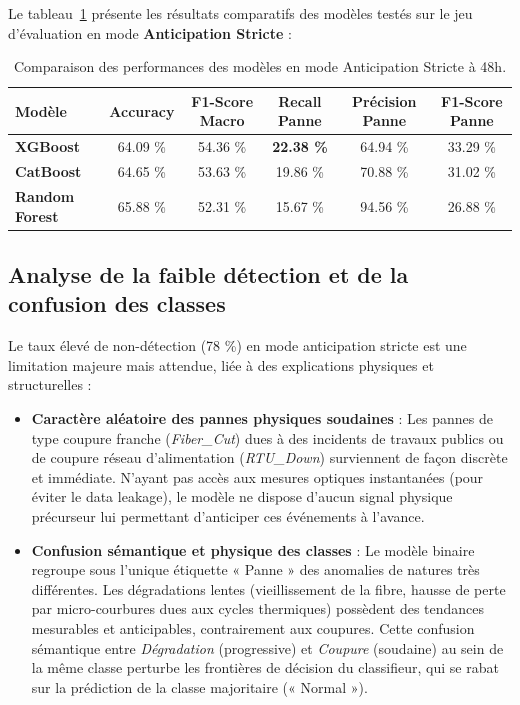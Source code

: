 \documentclass[11pt,a4paper]{article}
\begin{document}
Le tableau~\ref{tab:model_comparison} présente les résultats comparatifs des modèles testés sur le jeu d'évaluation en mode \textbf{Anticipation Stricte} :

\begin{table}[H]
\centering
\caption{Comparaison des performances des modèles en mode Anticipation Stricte à 48h.}
\label{tab:model_comparison}
\small
\begin{tabular}{lccccc}
\toprule
\textbf{Modèle} & \textbf{Accuracy} & \textbf{F1-Score Macro} & \textbf{Recall Panne} & \textbf{Précision Panne} & \textbf{F1-Score Panne} \\
\midrule
\textbf{XGBoost} & 64.09 \% & 54.36 \% & \textbf{22.38 \%} & 64.94 \% & 33.29 \% \\
\textbf{CatBoost} & 64.65 \% & 53.63 \% & 19.86 \% & 70.88 \% & 31.02 \% \\
\textbf{Random Forest} & 65.88 \% & 52.31 \% & 15.67 \% & 94.56 \% & 26.88 \% \\
\bottomrule
\end{tabular}
\end{table}

\subsection{Analyse de la faible détection et de la confusion des classes}
Le taux élevé de non-détection (78 \%) en mode anticipation stricte est une limitation majeure mais attendue, liée à des explications physiques et structurelles :
\begin{itemize}
    \item \textbf{Caractère aléatoire des pannes physiques soudaines} : Les pannes de type coupure franche (\textit{Fiber\_Cut}) dues à des incidents de travaux publics ou de coupure réseau d'alimentation (\textit{RTU\_Down}) surviennent de façon discrète et immédiate. N'ayant pas accès aux mesures optiques instantanées (pour éviter le data leakage), le modèle ne dispose d'aucun signal physique précurseur lui permettant d'anticiper ces événements à l'avance.
    \item \textbf{Confusion sémantique et physique des classes} : Le modèle binaire regroupe sous l'unique étiquette « Panne » des anomalies de natures très différentes. Les dégradations lentes (vieillissement de la fibre, hausse de perte par micro-courbures dues aux cycles thermiques) possèdent des tendances mesurables et anticipables, contrairement aux coupures. Cette confusion sémantique entre \textit{Dégradation} (progressive) et \textit{Coupure} (soudaine) au sein de la même classe perturbe les frontières de décision du classifieur, qui se rabat sur la prédiction de la classe majoritaire (« Normal »).
\end{itemize}
\end{document}
